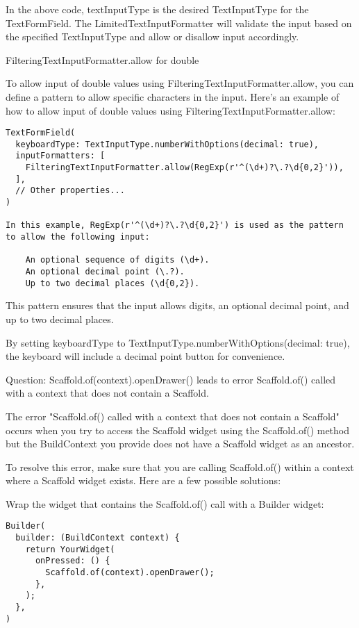 In the above code, textInputType is the desired TextInputType for the TextFormField. The LimitedTextInputFormatter 
will validate the input based on the specified TextInputType and allow or disallow input accordingly.

FilteringTextInputFormatter.allow for double

To allow input of double values using FilteringTextInputFormatter.allow, you can define a pattern to allow specific 
characters in the input. Here's an example of how to allow input of double values using 
FilteringTextInputFormatter.allow:

\begin{lstlisting}
TextFormField(
  keyboardType: TextInputType.numberWithOptions(decimal: true),
  inputFormatters: [
    FilteringTextInputFormatter.allow(RegExp(r'^(\d+)?\.?\d{0,2}')),
  ],
  // Other properties...
)

In this example, RegExp(r'^(\d+)?\.?\d{0,2}') is used as the pattern to allow the following input:

    An optional sequence of digits (\d+).
    An optional decimal point (\.?).
    Up to two decimal places (\d{0,2}).
\end{lstlisting}

This pattern ensures that the input allows digits, an optional decimal point, and up to two decimal places.

By setting keyboardType to TextInputType.numberWithOptions(decimal: true), the keyboard will include a 
decimal point button for convenience.

Question: Scaffold.of(context).openDrawer() leads to error Scaffold.of() called with a context that does 
not contain a Scaffold.

The error "Scaffold.of() called with a context that does not contain a Scaffold" occurs when you try to access 
the Scaffold widget using the Scaffold.of() method but the BuildContext you provide does not have a Scaffold 
widget as an ancestor.

To resolve this error, make sure that you are calling Scaffold.of() within a context where a Scaffold widget 
exists. Here are a few possible solutions:

Wrap the widget that contains the Scaffold.of() call with a Builder widget:

\begin{lstlisting}
Builder(
  builder: (BuildContext context) {
    return YourWidget(
      onPressed: () {
        Scaffold.of(context).openDrawer();
      },
    );
  },
)
\end{lstlisting}

